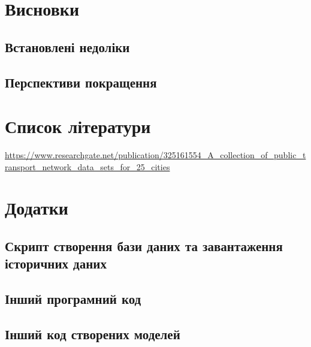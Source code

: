\documentclass[oneside,14pt]{extarticle}
\begin{document}
\section{Висновки}
\subsection{Встановлені недоліки}
\subsection{Перспективи покращення}
\newpage

\section{Список літератури}
\url{https://www.researchgate.net/publication/325161554_A_collection_of_public_transport_network_data_sets_for_25_cities}
\newpage

\section{Додатки}
\subsection{Скрипт створення бази даних та завантаження історичних даних}
{\small}

\subsection{Інший програмний код}
\subsection{Інший код створених моделей}
\end{document}
